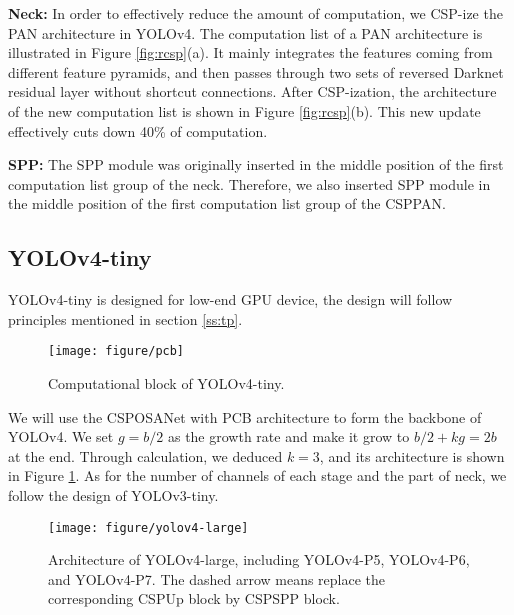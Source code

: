 \documentclass[10pt,twocolumn,letterpaper]{article}
\begin{document}
\noindent
\textbf{Neck:} In order to effectively reduce the amount of computation, we CSP-ize the PAN \cite{liu2018path} architecture in YOLOv4.  The computation list of a PAN architecture is illustrated in Figure \ref{fig:rcsp}(a).  It mainly integrates the features coming from different feature pyramids, and then passes through two sets of reversed Darknet residual layer without shortcut connections.  After CSP-ization, the architecture of the new computation list is shown in Figure \ref{fig:rcsp}(b). This new update effectively cuts down 40\% of computation.

\noindent
\textbf{SPP:} The SPP module was originally inserted in the middle position of the first computation list group of the neck.  Therefore, we also inserted SPP module in the middle position of the first computation list group of the CSPPAN.

\subsection{YOLOv4-tiny}

YOLOv4-tiny is designed for low-end GPU device, the design will follow principles mentioned in section \ref{ss:tp}.

\begin{figure}[h]
	\begin{center}
		\texttt{[image: figure/pcb]}
	\end{center}
	\vspace{-4mm}
	\caption{Computational block of YOLOv4-tiny.}
	\label{fig:pcb}
\end{figure}

We will use the CSPOSANet with PCB architecture to form the backbone of YOLOv4. We set $g = b/2$ as the growth rate and make it grow to $b/2+kg=2b$ at the end.  Through calculation, we deduced $k = 3$, and its architecture is shown in Figure \ref{fig:pcb}.  As for the number of channels of each stage and the part of neck, we follow the design of YOLOv3-tiny.

\begin{figure*}[t]
	\begin{center}
		\texttt{[image: figure/yolov4-large]}
	\end{center}
	\vspace{-4mm}
	\caption{Architecture of YOLOv4-large, including YOLOv4-P5, YOLOv4-P6, and YOLOv4-P7. The dashed arrow means replace the corresponding CSPUp block by CSPSPP block.}
	\label{fig:yolov4-large}
\end{figure*}
\end{document}
